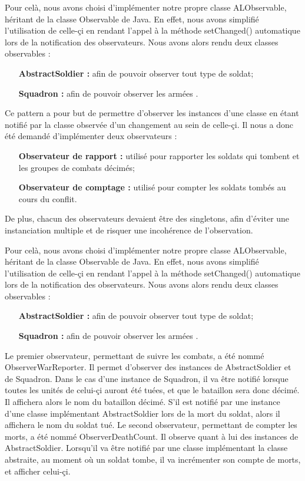 \documentclass[12pt]{article}
\begin{document}
Pour celà, nous avons choisi d'implémenter notre propre classe ALObservable, héritant de la classe Observable de Java. En effet, nous avons simplifié l'utilisation de celle-çi en rendant l'appel à la méthode setChanged() automatique lors de la notification des observateurs.
Nous avons alors rendu deux classes observables :
\begin{enumerate}
\item[\textbf{AbstractSoldier :}] afin de pouvoir observer tout type de soldat;
\item[\textbf{Squadron :}] afin de pouvoir observer les armées .
\end{enumerate}
Ce pattern a pour but de permettre d'observer les instances d'une classe en étant notifié par la classe observée d'un changement au sein de celle-çi. Il nous a donc été demandé d'implémenter deux observateurs :
\begin{enumerate}
\item[\textbf{Observateur de rapport :}] utilisé pour rapporter les soldats qui tombent et les groupes de combats décimés; 
\item[\textbf{Observateur de comptage :}] utilisé pour compter les soldats tombés au cours du conflit. 
\end{enumerate}
De plus, chacun des observateurs devaient être des singletons, afin d'éviter une instanciation multiple et de risquer une incohérence de l'observation.

Pour celà, nous avons choisi d'implémenter notre propre classe ALObservable, héritant de la classe Observable de Java. En effet, nous avons simplifié l'utilisation de celle-çi en rendant l'appel à la méthode setChanged() automatique lors de la notification des observateurs.
Nous avons alors rendu deux classes observables :
\begin{enumerate}
\item[\textbf{AbstractSoldier :}] afin de pouvoir observer tout type de soldat;
\item[\textbf{Squadron :}] afin de pouvoir observer les armées .
\end{enumerate}

Le premier observateur, permettant de suivre les combats, a été nommé ObserverWarReporter. Il permet d'observer des instances de AbstractSoldier et de Squadron.
Dans le cas d'une instance de Squadron, il va être notifié lorsque toutes les unités de celui-çi auront été tuées, et que le bataillon sera donc décimé. Il affichera alors le nom du bataillon décimé. S'il est notifié par une instance d'une classe implémentant AbstractSoldier lors de la mort du soldat, alors il affichera le nom du soldat tué.
Le second observateur, permettant de compter les morts, a été nommé ObserverDeathCount. Il observe quant à lui des instances de AbstractSoldier. Lorsqu'il va être notifié par une classe implémentant la classe abstraite, au moment où un soldat tombe, il va incrémenter son compte de morts, et afficher celui-çi.
\end{document}

